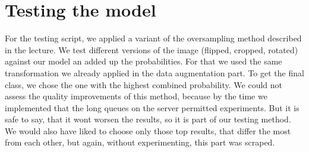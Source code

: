 \section{Testing the model}
For the testing script, we applied a variant of the oversampling method described in the lecture. We test different versions of the image (flipped, cropped, rotated) against our model an added up the probabilities. For that we used the same transformation we already applied in the data augmentation part. To get the final class, we chose the one with the highest combined probability. We could not assess the quality improvements of this method, because by the time we implemented that the long queues on the server permitted experiments. But it is safe to say, that it wont worsen the results, so it is part of our testing method. We would also have liked to choose only those top results, that differ the most from each other, but again, without experimenting, this part was scraped.


